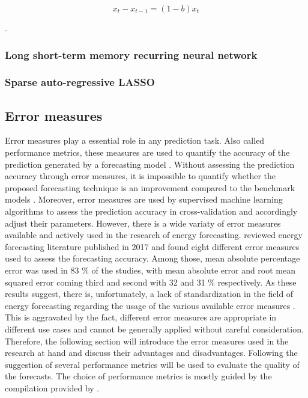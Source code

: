 \begin{equation} \label{Eq:ARIMA}
x_t-x_{t-1}=(1-b)x_t
\end{equation}

\citep{Box:1990}.


\subsubsection{Long short-term memory recurring neural network}



\subsubsection{Sparse auto-regressive LASSO}




\subsection{Error measures}\label{Sec:Method;Subsec:Error}

Error measures play a essential role in any prediction task. Also called performance metrics, these measures are used to quantify the accuracy of the prediction generated by a forecasting model \citep{zor:2017}. Without assessing the prediction accuracy through error measures, it is impossible to quantify whether the proposed forecasting technique is an improvement compared to the benchmark models \citep{Meer:2018}. Moreover, error measures are used by supervised machine learning algorithms to assess the prediction accuracy in cross-validation and accordingly adjust their parameters. However, there is a wide variaty of error measures available and actively used in the research of energy forecasting. \citet{zor:2017} reviewed energy forecasting literature published in 2017 and found eight different error measures used to assess the forecasting accuracy. Among those, mean absolute percentage error was used in 83 \% of the studies, with mean absolute error and root mean squared error coming third and second with 32 and 31 \% respectively. As these results suggest, there is, unfortunately, a lack of standardization in the field of energy forecasting regarding the usage of the various available error measures \citep{Meer:2018}. This is aggravated by the fact, different error measures are appropriate in different use cases and cannot be generally applied without careful consideration. Therefore, the following section will introduce the error measures used in the research at hand and discuss their advantages and disadvantages. Following the suggestion of \citet{Hoff:2013} several performance metrics will be used to evaluate the quality of the forecasts. The choice of performance metrics is mostly guided by the compilation provided by \citet{Meer:2018}.

